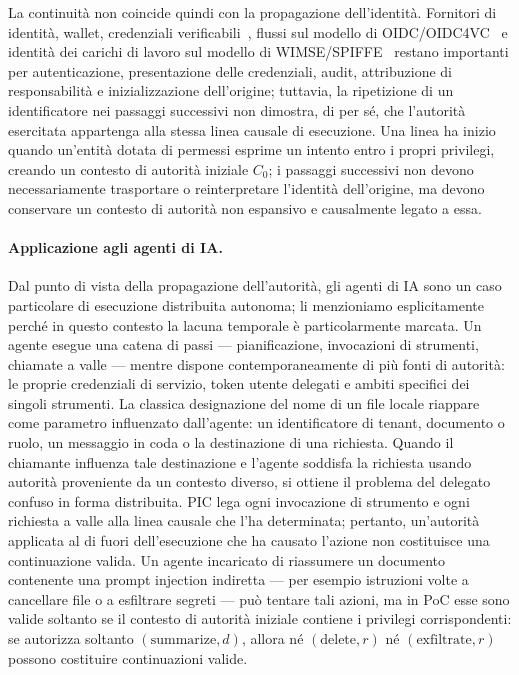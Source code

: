 \documentclass[11pt]{article}
\begin{document}
La continuità non coincide quindi con la propagazione dell'identità. Fornitori
di identità, wallet, credenziali verificabili~\cite{vcdm2022}, flussi sul modello
di OIDC/OIDC4VC~\cite{openidconnect2014,openid4vc2024} e identità dei carichi di
lavoro sul modello di WIMSE/SPIFFE~\cite{wimse2024,spiffe2017} restano importanti
per autenticazione, presentazione delle credenziali, audit, attribuzione di
responsabilità e inizializzazione dell'origine; tuttavia, la ripetizione di un
identificatore nei passaggi successivi non dimostra, di per sé, che l'autorità
esercitata appartenga alla stessa linea causale di esecuzione. Una linea ha
inizio quando un'entità dotata di permessi esprime un intento entro i propri
privilegi, creando un contesto di autorità iniziale $C_0$; i passaggi successivi
non devono necessariamente trasportare o reinterpretare l'identità dell'origine,
ma devono conservare un contesto di autorità non espansivo e causalmente legato
a essa.

\paragraph{Applicazione agli agenti di IA.}
Dal punto di vista della propagazione dell'autorità, gli agenti di IA sono un
caso particolare di esecuzione distribuita autonoma; li menzioniamo
esplicitamente perché in questo contesto la lacuna temporale è particolarmente
marcata. Un agente esegue una catena di passi --- pianificazione, invocazioni di
strumenti, chiamate a valle --- mentre dispone contemporaneamente di più fonti
di autorità: le proprie credenziali di servizio, token utente delegati e ambiti
specifici dei singoli strumenti. La classica designazione del nome di un file
locale riappare come parametro influenzato dall'agente: un identificatore di
tenant, documento o ruolo, un messaggio in coda o la destinazione di una
richiesta. Quando il chiamante influenza tale destinazione e l'agente soddisfa
la richiesta usando autorità proveniente da un contesto diverso, si ottiene il
problema del delegato confuso in forma distribuita. PIC lega ogni invocazione di
strumento e ogni richiesta a valle alla linea causale che l'ha determinata;
pertanto, un'autorità applicata al di fuori dell'esecuzione che ha causato
l'azione non costituisce una continuazione valida. Un agente incaricato di
riassumere un documento contenente una prompt injection indiretta --- per
esempio istruzioni volte a cancellare file o a esfiltrare segreti --- può tentare
tali azioni, ma in PoC esse sono valide soltanto se il contesto di autorità
iniziale contiene i privilegi corrispondenti: se autorizza soltanto
$(\text{summarize},d)$, allora né $(\text{delete},r)$ né
$(\text{exfiltrate},r)$ possono costituire continuazioni valide.
\end{document}
